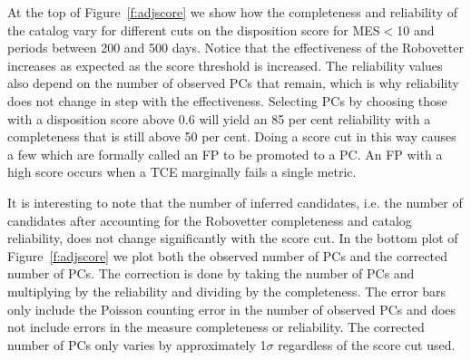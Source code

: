 At the top of Figure~\ref{f:adjscore} we show how the completeness and reliability of the catalog vary for different cuts on the disposition score for MES$<$10 and periods between 200 and 500 days. Notice that the effectiveness of the Robovetter increases as expected as the score threshold is increased. The reliability values also depend on the number of observed PCs that remain, which is why reliability does not change in step with the effectiveness. Selecting PCs by choosing those with a disposition score above 0.6 will yield an 85 per cent reliability with a completeness that is still above 50 per cent. Doing a score cut in this way causes a few  which are formally called an FP to be promoted to a PC. An FP with a high score occurs when a TCE marginally fails a single metric.  

It is interesting to note that the number of inferred candidates, i.e. the number of candidates after accounting for the Robovetter completeness and catalog reliability, does not change significantly with the score cut. In the bottom plot of Figure~\ref{f:adjscore} we plot both the observed number of PCs and the corrected number of PCs.  The correction is done by taking the number of PCs and multiplying by the reliability and dividing by the completeness.  The error bars only include the Poisson counting error in the number of observed PCs and does not include errors in the measure completeness or reliability. The corrected number of PCs only varies by approximately 1$\sigma$ regardless of the score cut used.   

